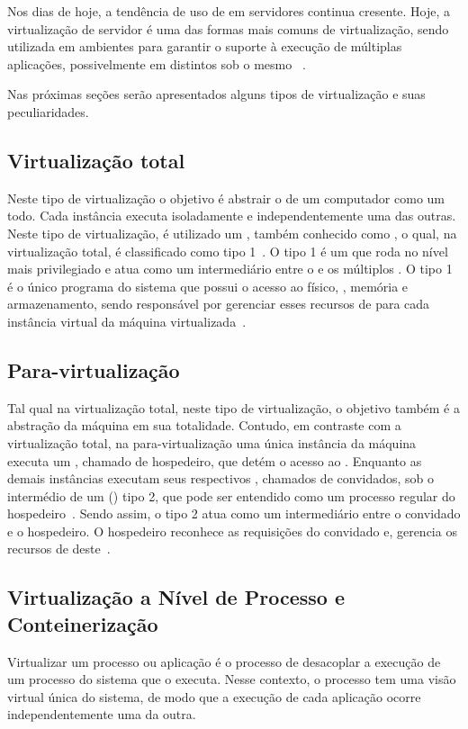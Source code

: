 Nos dias de hoje, a tendência de uso de \vms em servidores continua cresente. Hoje, a virtualização de servidor é uma das formas mais comuns de virtualização, sendo utilizada em ambientes \cloud para garantir o suporte à execução de múltiplas aplicações, possivelmente em \oss distintos sob o mesmo \hardware~\cite{manohar2013survey}.

Nas próximas seções serão apresentados alguns tipos de virtualização e suas peculiaridades.

\subsection{Virtualização total}
Neste tipo de virtualização o objetivo é abstrair o \hardware de um computador como um todo. Cada instância executa isoladamente e independentemente uma das outras. Neste tipo de virtualização, é utilizado um \vmm, também conhecido como \hypervisor, o qual, na virtualização total, é classificado como tipo 1~\cite{campbell2006introduction}. O \hypervisor tipo 1 é um \software que roda no nível mais privilegiado e atua como um intermediário entre o \hardware e os múltiplos \sos. O \hypervisor tipo 1 é o único programa do sistema que possui o acesso ao \hardware físico, \eg \cpu, memória e armazenamento, sendo responsável por gerenciar esses recursos de \hardware para cada instância virtual da máquina virtualizada~\cite{sweeney2016virtualization}.

\subsection{Para-virtualização}
Tal qual na virtualização total, neste tipo de virtualização, o objetivo também é a abstração da máquina em sua totalidade. Contudo, em contraste com a virtualização total, na para-virtualização uma única instância da máquina executa um \so, chamado de \so hospedeiro, que detém o acesso ao \hardware. Enquanto as demais instâncias executam seus respectivos \sos, chamados de \sos convidados, sob o intermédio de um \hypervisor (\vmm) tipo 2, que pode ser entendido como um processo regular do \so hospedeiro~\cite{campbell2006introduction}. Sendo assim, o \hypervisor tipo 2 atua como um intermediário entre o \so convidado e o \so hospedeiro. O \so hospedeiro reconhece as requisições do \so convidado e, gerencia os recursos de \hardware deste~\cite{sweeney2016virtualization}.

\subsection{Virtualização a Nível de Processo e Conteinerização}
Virtualizar um processo ou aplicação é o processo de desacoplar a execução de um processo do sistema que o executa. Nesse contexto, o processo tem uma visão virtual única do sistema, de modo que a execução de cada aplicação ocorre independentemente uma da outra.

